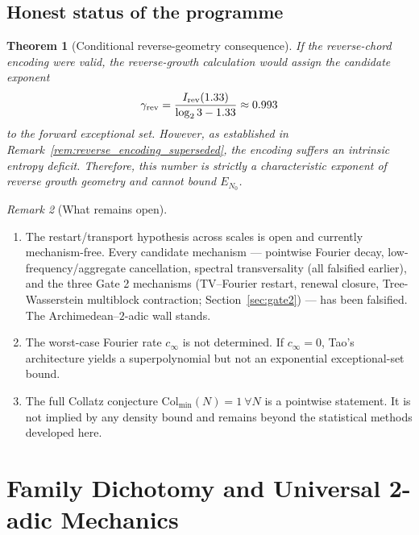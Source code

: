 \documentclass[12pt,a4paper]{article}
\newtheorem{theorem}{Theorem}[section]
\theoremstyle{remark}
\newtheorem{remark}[theorem]{Remark}
\begin{document}
\subsection{Honest status of the programme}
\begin{theorem}[Conditional reverse-geometry consequence]
\label{thm:final}
If the reverse-chord encoding were valid, the reverse-growth calculation
would assign the candidate exponent
\[
\gamma_{\rm rev}
=\frac{I_{\rm rev}(1.33)}{\log_2 3-1.33}\approx0.993
\]
to the forward exceptional set. However, as established in
Remark~\ref{rem:reverse_encoding_superseded}, the encoding suffers an intrinsic
entropy deficit. Therefore, this number is strictly a characteristic exponent of
reverse growth geometry and cannot bound $E_{N_0}$.
\end{theorem}
\begin{remark}[What remains open]
\begin{enumerate}
\item[(i)] The restart/transport hypothesis across scales is open and currently
mechanism-free. Every candidate mechanism --- pointwise Fourier decay,
low-frequency/aggregate cancellation, spectral transversality (all falsified
earlier), and the three Gate 2 mechanisms (TV--Fourier restart, renewal closure,
Tree-Wasserstein multiblock contraction; Section~\ref{sec:gate2}) --- has been
falsified. The Archimedean--$2$-adic wall stands.
\item[(ii)] The worst-case Fourier rate $c_\infty$ is not determined. If
$c_\infty=0$, Tao's architecture yields a superpolynomial but not an
exponential exceptional-set bound.
\item[(iii)] The full Collatz conjecture $\mathrm{Col}_{\min}(N)=1\ \forall N$
is a pointwise statement. It is not implied by any density bound and remains
beyond the statistical methods developed here.
\end{enumerate}
\end{remark}

\section{Family Dichotomy and Universal 2-adic Mechanics}
\end{document}

